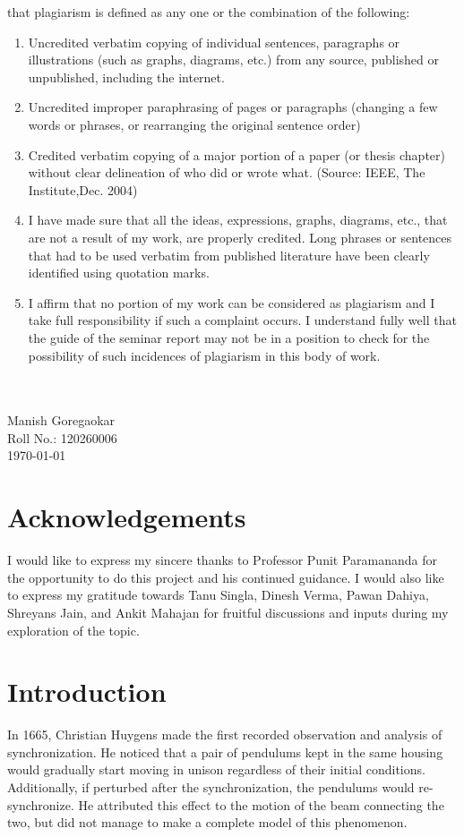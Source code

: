\documentclass[12pt]{article}
\begin{document}
that plagiarism is defined as any one or the combination of the following:
\begin{enumerate}
\item Uncredited verbatim copying of individual sentences, paragraphs or illustrations (such as graphs, diagrams, etc.) from any source, published or unpublished, including the internet.
\item Uncredited improper paraphrasing of pages or paragraphs (changing a few words or phrases, or rearranging the original sentence order)
\item  Credited verbatim copying of a major portion of a paper (or thesis chapter) without clear delineation of who did or wrote what. (Source: IEEE, The Institute,Dec. 2004)
\item I have made sure that all the ideas, expressions, graphs, diagrams, etc., that are not a result of my work, are properly credited. Long phrases or sentences that had to be used verbatim from published literature have been clearly identified using quotation marks.
\item I affirm that no portion of my work can be considered as plagiarism and I take full responsibility if such a complaint occurs. I understand fully well that the guide of the seminar report may not be in a position to check for the possibility of such incidences of plagiarism in this body of work.
\end{enumerate}
\quad
\\\quad
\\Manish Goregaokar
\\Roll No.: 120260006
\\\today
\pagebreak
{}
\section*{Acknowledgements}
I would like to express my sincere thanks to Professor Punit Paramananda for the opportunity to do this project and his continued guidance. I would also like to express my gratitude towards Tanu Singla, Dinesh Verma, Pawan Dahiya, Shreyans Jain, and Ankit Mahajan for fruitful discussions and inputs during my exploration of the topic.
\pagebreak
\addtocounter{section}{-3}
\tableofcontents\newpage
\section{Introduction}

In 1665, Christian Huygens made the first recorded observation and analysis of synchronization\cite{bennett2002huygens}. He noticed that a pair of pendulums kept in the same housing would gradually start moving in unison regardless of their initial conditions. Additionally, if perturbed after the synchronization, the pendulums would re-synchronize. He attributed this effect to the motion of the beam connecting the two, but did not manage to make a complete model of this phenomenon.
\end{document}
